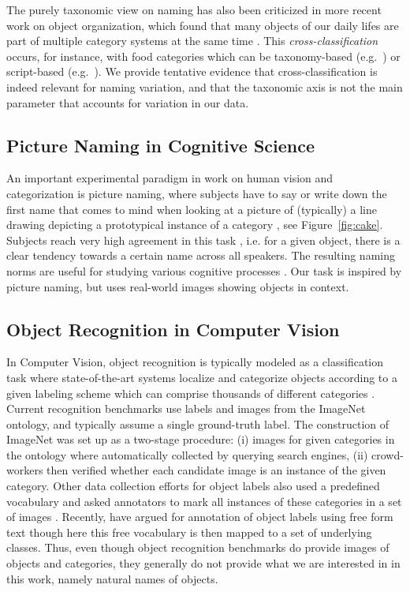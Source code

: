 The purely taxonomic view on naming has also been criticized in more recent work on object organization, which found that many objects of our daily lifes are part of multiple category systems at the same time \cite{ross1999food,SHAFTO20111}. 
This \textit{cross-classification} occurs, for instance, with food categories which can be taxonomy-based (e.g.\ ) or script-based (e.g.\  ).
We provide tentative evidence that cross-classification is indeed relevant for naming variation, and that the taxonomic axis is not the main parameter that accounts for variation in our data.

\subsection{Picture Naming in Cognitive Science}

An important experimental paradigm in work on human vision and categorization is picture naming, where subjects have to say or write down the first name that comes to mind when looking at a picture of (typically) a line drawing depicting a prototypical instance of a category \cite{snodgrass,rossion2004revisiting}, see Figure\ \ref{fig:cake}.
Subjects reach very high agreement in this task \cite{rossion2004revisiting}, i.e. for a given object, there is a clear tendency towards a certain name across all speakers.
The resulting naming norms are useful for studying various cognitive processes \cite{humphreys1988cascade}.
Our task is inspired by picture naming, but uses real-world images showing objects in context.

\subsection{Object Recognition in Computer Vision}

In Computer Vision, object recognition is typically modeled as a classification task where state-of-the-art systems localize and categorize objects according to a given labeling scheme which can comprise thousands of different categories  \cite{googlenet,ILSVRC15}. 
Current recognition benchmarks use labels and images from the ImageNet \cite{imagenet_cvpr09} ontology, and typically assume a single ground-truth label. 
The construction of ImageNet was set up as a two-stage procedure: (i) images for given categories in the ontology where automatically collected by querying search engines, (ii) crowd-workers then verified whether each candidate image is an instance of the given category.
Other data collection efforts for object labels also used a predefined vocabulary and asked annotators to mark all instances of these categories in a set of images \cite{mscoco,OpenImages}. 
Recently,  have argued for annotation of object labels using free form text though here this free vocabulary is then mapped to a set of underlying classes.
Thus, even though object recognition benchmarks do provide images of objects and categories, they generally do not provide what we are interested in in this work, namely natural names of objects.



